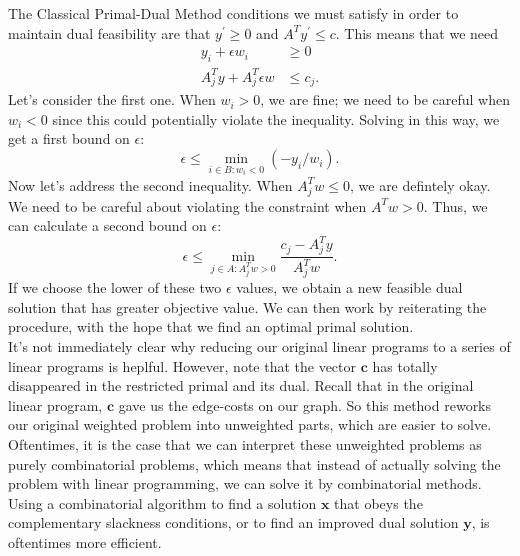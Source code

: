 \documentclass[11pt]{article}
\renewcommand{\'}{^{'}}
\begin{document}
\begin{section}{The Classical Primal-Dual Method}
	conditions we must satisfy in order to maintain dual feasibility are that $y^{'} \geq 0$ and 
	$A^{T}y^{'} \leq c$. This means that we need 
	\begin{align}
		y_i + \epsilon w_i &\geq 0 \\
		A^{T}_j y + A^T_j \epsilon w & \leq c_j.
	\end{align}
	Let's consider the first one. When $w_i > 0$, we are fine; we need to be careful when 
	$w_i < 0$ since this could potentially violate the inequality. Solving in this way, we get 
	a first bound on $\epsilon$:
	\[
		\epsilon \leq \min_{i\in B: w_i < 0} (-y_i/w_i).
	\]
	Now let's address the second inequality. When $A^{T}_jw \leq 0$, we are defintely okay. We 
	need to be careful about violating the constraint when $A^{T}w > 0$. Thus, we can calculate a 
	second bound on $\epsilon$:
	\[
		\epsilon \leq \min_{j\in A: A^{T}_jw > 0} \frac{c_j-A^{T}_jy}{A^{T}_j w}.
	\]
	If we choose the lower of these two $\epsilon$ values, we obtain a new feasible dual solution 
	that has greater objective value. We can then work by reiterating the procedure, with the hope 
	that we find an optimal primal solution.\\
	It's not immediately clear why reducing our original linear programs to a series of linear 
	programs is heplful. However,  note that the vector $\mathbf{c}$ has totally disappeared in 
	the restricted primal and its dual. Recall that in the original linear program, $\mathbf{c}$ 
	gave us the edge-costs on our graph. So this method reworks our original weighted problem 
	into unweighted parts, which are easier to solve. Oftentimes, it is the case that 
	we can interpret these unweighted problems as purely combinatorial problems, which means that 
	instead of actually solving the problem with linear programming, we can solve it by 
	combinatorial 
	methods. Using a combinatorial algorithm to find a solution $\mathbf{x}$ that obeys the 
	complementary slackness conditions, or to find an improved dual solution $\mathbf{y}$, is 
	oftentimes more efficient.
\end{section}
	
\end{document}
